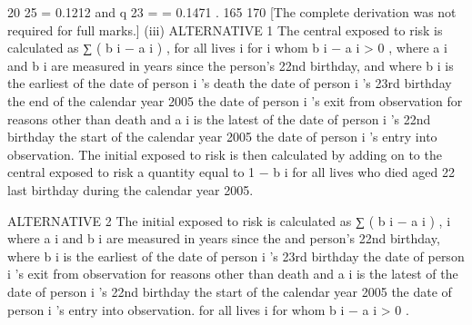 \documentclass[a4paper,12pt]{article}
\begin{document}
20
25
= 0.1212 and q 23 =
= 0.1471 .
165
170
[The complete derivation was not required for full marks.]
(iii)
ALTERNATIVE 1
The central exposed to risk is calculated as
∑ ( b i − a i ) , for all lives i for
i
whom b i − a i > 0 ,
where a i and b i are measured in years since the person’s 22nd birthday, and
where b i is the earliest of
the date of person i ’s death
the date of person i ’s 23rd birthday
the end of the calendar year 2005
the date of person i ’s exit from observation for reasons
other than death
and a i is the latest of
the date of person i ’s 22nd birthday
the start of the calendar year 2005
the date of person i ’s entry into observation.
The initial exposed to risk is then calculated by adding on to the central exposed to risk a quantity equal to 1 − b i for all lives who died aged 22 last
birthday during the calendar year 2005.

\newpage
ALTERNATIVE 2
The initial exposed to risk is calculated as
∑ ( b i − a i ) ,
i
where a i and b i are measured in years since the
and
person’s 22nd birthday,
where b i is the earliest of
the date of person i ’s 23rd birthday
the date of person i ’s exit from observation for reasons other than death
and a i is the latest of
the date of person i ’s 22nd birthday
the start of the calendar year 2005
the date of person i ’s entry into observation.
for all lives i for whom b i − a i > 0 .
\end{document}
